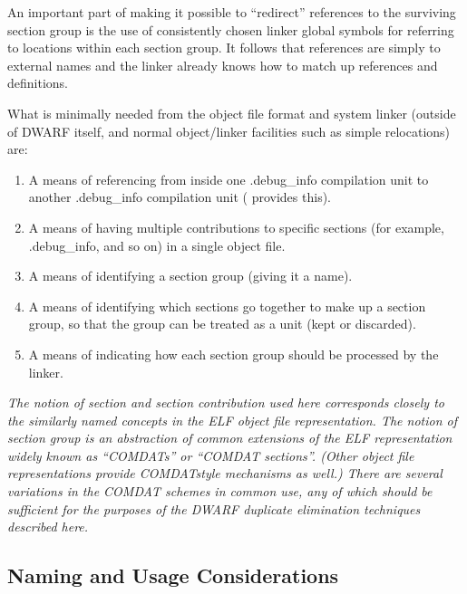 An important part of making it possible to “redirect”
references to the surviving section group is the use of
consistently chosen linker global symbols for referring to
locations within each section group. It follows that references
are simply to external names and the linker already knows
how to match up references and definitions.

What is minimally needed from the object file format and system
linker (outside of DWARF itself, and normal object/linker
facilities such as simple relocations) are:

\begin{enumerate}[1.]

\item A means of referencing from inside one .debug\_info
compilation unit to another .debug\_info compilation unit
( provides this).

\item A means of having multiple contributions to specific sections
(for example, .debug\_info, and so on) in a single object file.

\item  A means of identifying a section group (giving it a name).

\item A means of identifying which sections go together to make
up a section group, so that the group can be treated as a unit
(kept or discarded).

\item  A means of indicating how each section group should be
processed by the linker.

\end{enumerate}

\textit{The notion of section and section contribution used here
corresponds closely to the similarly named concepts in the
ELF object file representation. The notion of section group is
an abstraction of common extensions of the ELF representation
widely known as ``COMDATs'' or ``COMDAT sections''. (Other
object file representations provide COMDAT\dash style mechanisms as
well.) There are several variations in the COMDAT schemes in
common use, any of which should be sufficient for the purposes
of the DWARF duplicate elimination techniques described here.}

\subsection{Naming and Usage Considerations}
\label{app:namingandusageconsiderations}

